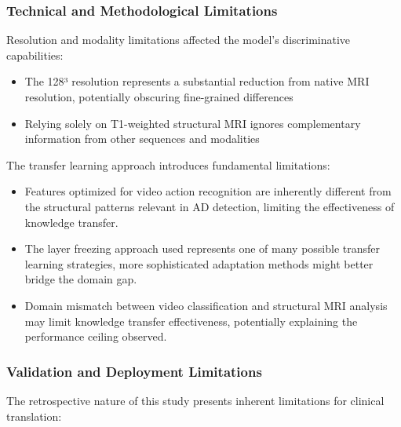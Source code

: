 \documentclass[12pt, a4paper]{article}
\begin{document}
\subsubsection{Technical and Methodological Limitations}

Resolution and modality limitations affected the model's discriminative capabilities:

\begin{itemize}
    \item The 128³ resolution represents a substantial reduction from native MRI resolution, potentially obscuring fine-grained differences
    \item Relying solely on T1-weighted structural MRI ignores complementary information from other sequences and modalities
\end{itemize}

The transfer learning approach introduces fundamental limitations:

\begin{itemize}
    \item Features optimized for video action recognition are inherently different from the structural patterns relevant in AD detection, limiting the effectiveness of knowledge transfer.
    \item The layer freezing approach used represents one of many possible transfer learning strategies, more sophisticated adaptation methods might better bridge the domain gap.
    \item Domain mismatch between video classification and structural MRI analysis may limit knowledge transfer effectiveness, potentially explaining the performance ceiling observed.
\end{itemize}

\subsubsection{Validation and Deployment Limitations}

The retrospective nature of this study presents inherent limitations for clinical translation:
\end{document}
